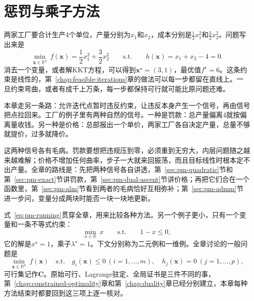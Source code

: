 \chapter{惩罚与乘子方法}
\label{chap:penalty-multiplier-methods}

两家工厂要合计生产$4$个单位，产量分别为$x_1$和$x_2$，成本分别是$\tfrac12x_1^2$和$\tfrac32x_2^2$。问题写出来是
\begin{equation}
 \min_{\bm{x}\in\mathbb{R}^2}\ f(\bm{x})=\frac12x_1^2+\frac32x_2^2
 \qquad\text{s.t.}\qquad h(\bm{x})=x_1+x_2-4=0 .
 \label{eq:pm-running}
\end{equation}
消去一个变量，或者解KKT方程，可以得到$\bm{x}^\star=(3,1)$，最优值$f^\star=6$。这条约束是线性的，第~\ref{chap:feasible-iterations}章的做法可以每一步都留在直线上。一旦约束弯曲，或者有成千上万条，每一步都保持可行就可能比原问题还难。

本章走另一条路：允许迭代点暂时违反约束，让违反本身产生一个信号，再由信号把点拉回来。工厂的例子里有两种自然的信号。一种是罚款：总产量偏离$4$就按偏离量收钱。另一种是价格：总部报出一个单价，两家工厂各自决定产量，总量不够就提价，过多就降价。

这两种信号各有毛病。罚款要想把违规压到零，必须重到无穷大，内层问题随之越来越难解；价格不增加任何曲率，步子一大就来回振荡，而且目标线性时根本定不出产量。全章的路线是：先把两种信号各自讲透，第~\ref{sec:pm-quadratic}节和第~\ref{sec:pm-exact}节讲罚款，第~\ref{sec:pm-dual-ascent}节讲价格；再把它们合在一个函数里，第~\ref{sec:pm-alm}节看到两者的毛病恰好互相弥补；第~\ref{sec:pm-admm}节进一步问，变量分成两块时能否一块一块地更新。

式~\eqref{eq:pm-running}贯穿全章，用来比较各种方法。另一个例子更小，只有一个变量和一条不等式约束：
\begin{equation}
 \min_{x\in\mathbb{R}}\ x\qquad\text{s.t.}\qquad 1-x\leq0 ,
 \label{eq:pm-one-dim}
\end{equation}
它的解是$x^\star=1$，乘子$\lambda^\star=1$。下文分别称为二元例和一维例。全章讨论的一般问题是
\begin{equation}
 \min_{\bm{x}\in\mathbb{R}^n}\ f(\bm{x})
 \quad\text{s.t.}\quad g_i(\bm{x})\leq0\ (i=1,\ldots,m),\quad h_j(\bm{x})=0\ (j=1,\ldots,p),
 \label{eq:pm-problem}
\end{equation}
可行集记作$\bm{C}$。原始可行、Lagrange驻定、全局证书是三件不同的事，第~\ref{chap:constrained-optimality}章和第~\ref{chap:duality}章已经分别建立，本章每种方法结束时都要回到这三项上逐一核对。








